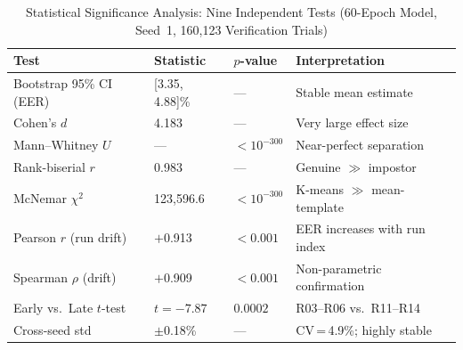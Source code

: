 
\begin{table}[t]
\centering
\caption{Statistical Significance Analysis: Nine Independent Tests
         (60-Epoch Model, Seed~1, 160{,}123 Verification Trials)}
\label{tab:stats}
\begin{tabular}{llll}
\toprule
\textbf{Test} & \textbf{Statistic} & \textbf{$p$-value}
              & \textbf{Interpretation} \\
\midrule
Bootstrap 95\% CI (EER)   & [3.35, 4.88]\%      & ---
  & Stable mean estimate \\
Cohen's $d$               & 4.183               & ---
  & Very large effect size \\
Mann--Whitney $U$         & ---                 & $<10^{-300}$
  & Near-perfect separation \\
Rank-biserial $r$         & 0.983               & ---
  & Genuine $\gg$ impostor \\
McNemar $\chi^2$          & 123{,}596.6         & $<10^{-300}$
  & K-means $\gg$ mean-template \\
Pearson $r$ (run drift)   & $+$0.913            & $<0.001$
  & EER increases with run index \\
Spearman $\rho$ (drift)   & $+$0.909            & $<0.001$
  & Non-parametric confirmation \\
Early vs.\ Late $t$-test  & $t = -7.87$         & $0.0002$
  & R03--R06 vs.\ R11--R14 \\
Cross-seed std            & $\pm$0.18\%         & ---
  & CV\,=\,4.9\%; highly stable \\
\bottomrule
\end{tabular}
\end{table}
